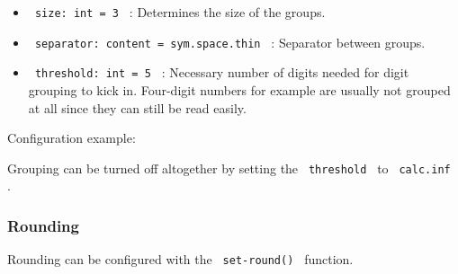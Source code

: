 \begin{Shaded}
\begin{Highlighting}[]
\NormalTok{)}
\end{Highlighting}
\end{Shaded}

\begin{itemize}
\tightlist
\item
  \texttt{\ size:\ int\ =\ 3\ } : Determines the size of the groups.
\item
  \texttt{\ separator:\ content\ =\ sym.space.thin\ } : Separator
  between groups.
\item
  \texttt{\ threshold:\ int\ =\ 5\ } : Necessary number of digits needed
  for digit grouping to kick in. Four-digit numbers for example are
  usually not grouped at all since they can still be read easily.
\end{itemize}

Configuration example:

\begin{Shaded}
\begin{Highlighting}[]
\end{Highlighting}
\end{Shaded}

Grouping can be turned off altogether by setting the
\texttt{\ threshold\ } to \texttt{\ calc.inf\ } .

\subsubsection{Rounding}\label{rounding}

Rounding can be configured with the \texttt{\ set-round()\ } function.

\begin{Shaded}
\begin{Highlighting}[]
\NormalTok{)}
\end{Highlighting}
\end{Shaded}


